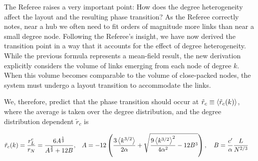 \documentclass[11pt]{article}
\newcommand{\outNim}[1]{}
\begin{document}
\begin{response}
{\begin{figure}
{    %
    }
    \label{fig:phase-collapse}
\end{figure}
}%
The Referee raises a very important point: How does the degree heterogeneity affect the layout and the resulting phase transition? 
As the Referee correctly notes, near a hub we often need to fit orders of magnitude more links than near a small degree node. 
Following the Referee's insight, we have now derived  the transition point in a way that it accounts for the effect of degree heterogeneity. 
While the previous formula represents a mean-field result, the new derivation explicitly considers the volume of links emerging from each node of degree $k$. 
When this volume becomes comparable to the volume of close-packed nodes, the system must undergo a layout transition to accommodate the links.
{ 
We, therefore, predict that the phase transition should occur at $\tilde{r}_c \equiv \left<\tilde{r}_c(k)\right>$, where the average is taken over the degree distribution, and the degree distribution dependent $\tilde{r}_c$ is   
\outNim{
\begin{align}
    \tilde{r}_c(k) = {r^c_L\over r_N} 
    &=\frac{6A^{{1\over 3}}}{A^{\frac{2}{3}} + 12 B}, &A& =- 12 \pr{{ 3k^{3/2}\over \alpha } + \sqrt{{ 9 k^{3}\over \alpha^2 }- 12 B^3 }},\quad B = {c\over \alpha}{L\over N^{2/3}} \label{eq:trans-rc-full-1}
\end{align}
}
\begin{align}
    \tilde{r}_c(k) = {r^c_L\over r_N} 
    &=\frac{6A^{{1\over 3}}}{A^{\frac{2}{3}} + 12 B}, &A& =- 12 \pr{{ 3\be{k^{3/2}}\over 2\alpha } + \sqrt{{ 9 \be{k^{3/2}}^2\over 4\alpha^2 }- 12 B^3 }},\quad B = {c'\over \alpha}{L\over N^{2/3}} \label{eq:trans-rc-full-1}

\end{align}}
\end{response}
\end{document}
